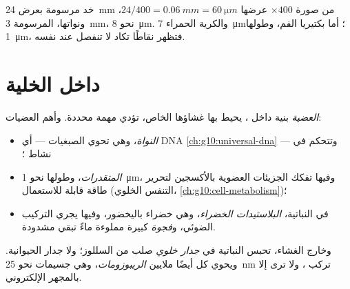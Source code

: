 \begin{example}\label{ex:g10:cells-common-unit:cheek}
 خد مرسومة بعرض \qty{24}{mm} من صورة  $\times 400$ عرضها
$24/400 = \qty{0.06}{mm} = \qty{60}{\micro m}$، ونواتها، المرسومة
\qty{3}{mm}، نحو \qty{8}{\micro m}. والكرية الحمراء
\qty{7}{\micro m}؛ أما بكتيريا الفم، وطولها \qty{1}{\micro m}، فتظهر
نقاطًا تكاد لا تنفصل عند  نفسه.
\end{example}

\section{داخل الخلية}

\begin{definition}[العضية]\label{def:g10:cells-common-unit:organelle}
\emph{العضية} بنية داخل ، يحيط بها غشاؤها الخاص،
تؤدي مهمة محددة. وأهم العضيات:
\begin{itemize}
  \item \emph{النواة}، وهي تحوي الصبغيات --- أي DNA
        \cref{ch:g10:universal-dna} --- وتتحكم في نشاط ؛
  \item \emph{المتقدرات}، وطولها نحو
        \qty{1}{\micro m}، وفيها تفكك الجزيئات العضوية بالأكسجين
        لتحرير طاقة قابلة للاستعمال (التنفس الخلوي،
        \cref{ch:g10:cell-metabolism})؛
  \item في  النباتية، \emph{البلاستيدات
        الخضراء}، وهي خضراء باليخضور، وفيها يجري
        التركيب الضوئي، و\emph{فجوة} كبيرة مملوءة ماءً
        تبقي  مشدودة.
\end{itemize}
وخارج الغشاء، تحبس  النباتية في \emph{جدار خلوي}
صلب من السللوز؛ ولا جدار  الحيوانية. ويحوي  كل
 أيضًا ملايين \emph{الريبوزومات}، وهي جسيمات نحو
\qty{25}{nm} تركب ، ولا ترى إلا بالمجهر الإلكتروني.
\end{definition}

